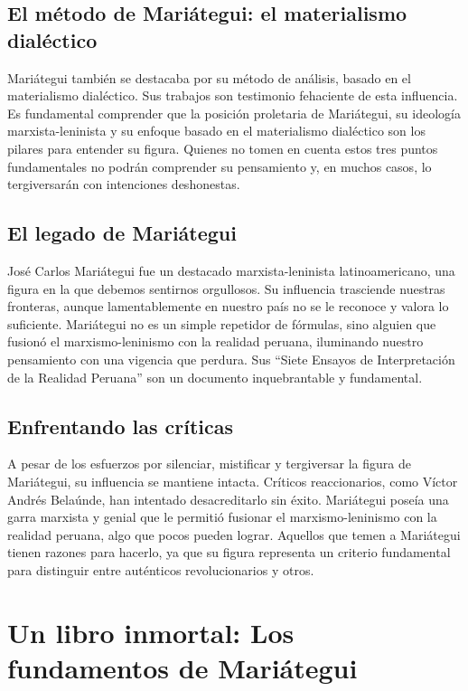 \documentclass[
  jou,
  floatsintext,
  longtable,
  a4paper,
  nolmodern,
  notxfonts,
  notimes,
  12pt,
  colorlinks=true,linkcolor=blue,citecolor=blue,urlcolor=blue]{apa7}
\begin{document}
\subsection{El método de Mariátegui: el materialismo
dialéctico}\label{el-muxe9todo-de-mariuxe1tegui-el-materialismo-dialuxe9ctico}

Mariátegui también se destacaba por su método de análisis, basado en el
materialismo dialéctico. Sus trabajos son testimonio fehaciente de esta
influencia. Es fundamental comprender que la posición proletaria de
Mariátegui, su ideología marxista-leninista y su enfoque basado en el
materialismo dialéctico son los pilares para entender su figura. Quienes
no tomen en cuenta estos tres puntos fundamentales no podrán comprender
su pensamiento y, en muchos casos, lo tergiversarán con intenciones
deshonestas.

\subsection{El legado de Mariátegui}\label{el-legado-de-mariuxe1tegui}

José Carlos Mariátegui fue un destacado marxista-leninista
latinoamericano, una figura en la que debemos sentirnos orgullosos. Su
influencia trasciende nuestras fronteras, aunque lamentablemente en
nuestro país no se le reconoce y valora lo suficiente. Mariátegui no es
un simple repetidor de fórmulas, sino alguien que fusionó el
marxismo-leninismo con la realidad peruana, iluminando nuestro
pensamiento con una vigencia que perdura. Sus ``Siete Ensayos de
Interpretación de la Realidad Peruana'' son un documento inquebrantable
y fundamental.

\subsection{Enfrentando las críticas}\label{enfrentando-las-cruxedticas}

A pesar de los esfuerzos por silenciar, mistificar y tergiversar la
figura de Mariátegui, su influencia se mantiene intacta. Críticos
reaccionarios, como Víctor Andrés Belaúnde, han intentado desacreditarlo
sin éxito. Mariátegui poseía una garra marxista y genial que le permitió
fusionar el marxismo-leninismo con la realidad peruana, algo que pocos
pueden lograr. Aquellos que temen a Mariátegui tienen razones para
hacerlo, ya que su figura representa un criterio fundamental para
distinguir entre auténticos revolucionarios y otros.

\section{Un libro inmortal: Los fundamentos de
Mariátegui}\label{un-libro-inmortal-los-fundamentos-de-mariuxe1tegui}
\end{document}
